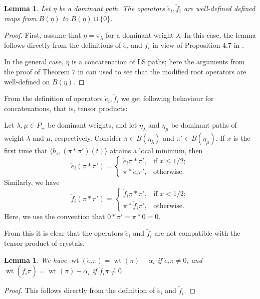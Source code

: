 \documentclass[final]{amsart}
\theoremstyle{plain}
\newtheorem{lemma}[corollary]{Lemma}
\theoremstyle{definition}
\newcommand{\cf}{\check{f}}
\newcommand{\ce}{\check{e}}
\DeclareMathOperator{\weight}{wt}
\begin{document}
\begin{lemma}
    \label{lemma:modified-root-operators-well-defined}
    Let $\eta$ be a dominant path.
    The operators $\ce_i, \cf_i$ are well-defined defined maps from $B(\eta)$ to $B(\eta) \sqcup \{ 0 \}$.
\end{lemma}
\begin{proof}
    First, assume that $\eta = \pi_\lambda$ for a dominant weight $\lambda$.
    In this case, the lemma follows directly from the definitions of $\ce_i$ and $\cf_i$ in view of Proposition 4.7 in \cite{Littelmann:Paths-RootOperators-RepresentationTheory}.

    In the general case, $\eta$ is a concatenation of LS paths; here the arguments from the proof of Theorem 7 in \cite{Littelmann:PlacticAlgebra-SemisimpleLieAlgebras} can used to see that the modified root operators are well-defined on $B(\eta)$.
\end{proof}

From the definition of operators $\ce_i, \cf_i$ we get following behaviour for concatenations, that is, tensor products:

Let $\lambda, \mu \in P_+$ be dominant weights, and let $\eta_\lambda$ and $\eta_\mu$ be dominant paths of weight $\lambda$ and $\mu$, respectively.
Consider $\pi \in B(\eta_\lambda)$ and $\pi' \in B(\eta_\mu)$.
If $x$ is the first time that $\langle h_i, (\pi*\pi')(t)\rangle$ attains a local minimum, then
\[
    \ce_i(\pi * \pi') =
    \begin{cases}
        \ce_i\pi * \pi', & \text{if } x \le 1/2; \\
        \pi * \ce_i\pi', & \text{otherwise}.
    \end{cases}
\]
Similarly, we have
\[
    \cf_i(\pi * \pi') =
    \begin{cases}
        \cf_i\pi * \pi', & \text{if } x < 1/2; \\
        \pi * \cf_i\pi', & \text{otherwise}.
    \end{cases}
\]
Here, we use the convention that $0 * \pi' = \pi * 0 = 0$.

From this it is clear that the operators $\ce_i$ and $\cf_i$ are not compatible with the tensor product of crystals.

\begin{lemma}
    We have $\weight(\ce_i\pi) = \weight(\pi) + \alpha_i$ if $\ce_i\pi \neq 0$, and $\weight(\cf_i\pi) = \weight(\pi) - \alpha_i$ if $\cf_i\pi \neq 0$.
\end{lemma}
\begin{proof}
    This follows directly from the definition of $\ce_i$ and $\cf_i$.
\end{proof}
\end{document}
